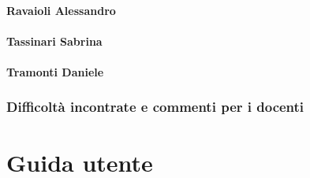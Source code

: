 \documentclass{report}
\begin{document}
\subsubsection{Ravaioli Alessandro}

\subsubsection{Tassinari Sabrina}

\subsubsection{Tramonti Daniele}

\subsection{Difficoltà incontrate e commenti per i docenti}

\appendix
\chapter{Guida utente}
\end{document}
